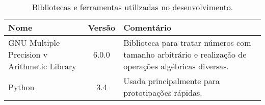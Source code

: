 %
%
%
\begin{table}[!ht]
\centering
    \begin{tabularx}{0.95\textwidth}{lcX}
    
    \toprule
        \textbf{Nome}  &  \textbf{Versão}  &  \textbf{Comentário}  \\
    \midrule
        GNU Multiple  Precision v Arithmetic Library & 6.0.0    & Biblioteca para tratar números com tamanho arbitrário e realização de operações algébricas diversas.  \\
        \rowcolor[gray]{0.9}
        Python                                       & 3.4      & Usada principalmente para prototipações rápidas.                                                      \\
    \bottomrule
    
    \end{tabularx}
\caption{Bibliotecas e ferramentas utilizadas no desenvolvimento.}
\label{table:libs}

\end{table}


